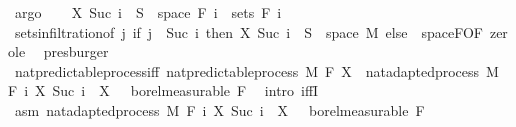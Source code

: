 \begin{isabellebody}
\ argo\isanewline
\ \ \isamarkupfalse%
\ {\isachardoublequoteopen}X\ {\isacharparenleft}{\kern0pt}Suc\ i{\isacharparenright}{\kern0pt}\ {\isacharminus}{\kern0pt}{\isacharbackquote}{\kern0pt}\ S\ {\isasyminter}\ space\ {\isacharparenleft}{\kern0pt}F\ i{\isacharparenright}{\kern0pt}\ {\isasymin}\ sets\ {\isacharparenleft}{\kern0pt}F\ i{\isacharparenright}{\kern0pt}{\isachardoublequoteclose}\ \isamarkupfalse%
\ sets{\isacharunderscore}{\kern0pt}in{\isacharunderscore}{\kern0pt}filtration{\isacharbrackleft}{\kern0pt}of\ {\isachardoublequoteopen}{\isasymlambda}j{\isachardot}{\kern0pt}\ if\ j\ {\isacharequal}{\kern0pt}\ Suc\ i\ then\ {\isacharparenleft}{\kern0pt}X\ {\isacharparenleft}{\kern0pt}Suc\ i{\isacharparenright}{\kern0pt}\ {\isacharminus}{\kern0pt}{\isacharbackquote}{\kern0pt}\ S\ {\isasyminter}\ space\ M{\isacharparenright}{\kern0pt}\ else\ {\isacharbraceleft}{\kern0pt}{\isacharbraceright}{\kern0pt}{\isachardoublequoteclose}{\isacharbrackright}{\kern0pt}\ space{\isacharunderscore}{\kern0pt}F{\isacharbrackleft}{\kern0pt}OF\ zero{\isacharunderscore}{\kern0pt}le{\isacharbrackright}{\kern0pt}\ \isamarkupfalse%
\ presburger\isanewline
{}\isamarkupfalse%
%
\endisatagproof
{\isafoldproof}%
%
\isadelimproof
\isanewline
%
\endisadelimproof
\isanewline
{}\isamarkupfalse%
\ nat{\isacharunderscore}{\kern0pt}predictable{\isacharunderscore}{\kern0pt}process{\isacharunderscore}{\kern0pt}iff{\isacharcolon}{\kern0pt}\ {\isachardoublequoteopen}nat{\isacharunderscore}{\kern0pt}predictable{\isacharunderscore}{\kern0pt}process\ M\ F\ X\ {\isasymlongleftrightarrow}\ nat{\isacharunderscore}{\kern0pt}adapted{\isacharunderscore}{\kern0pt}process\ M\ F\ {\isacharparenleft}{\kern0pt}{\isasymlambda}i{\isachardot}{\kern0pt}\ X\ {\isacharparenleft}{\kern0pt}Suc\ i{\isacharparenright}{\kern0pt}{\isacharparenright}{\kern0pt}\ {\isasymand}\ X\ {}\ {\isasymin}\ borel{\isacharunderscore}{\kern0pt}measurable\ {\isacharparenleft}{\kern0pt}F\ {}{\isacharparenright}{\kern0pt}{\isachardoublequoteclose}\isanewline
%
\isadelimproof
%
\endisadelimproof
%
\isatagproof
{}\isamarkupfalse%
\ {\isacharparenleft}{\kern0pt}intro\ iffI{\isacharparenright}{\kern0pt}\isanewline
\ \ \isamarkupfalse%
\ asm{\isacharcolon}{\kern0pt}\ {\isachardoublequoteopen}nat{\isacharunderscore}{\kern0pt}adapted{\isacharunderscore}{\kern0pt}process\ M\ F\ {\isacharparenleft}{\kern0pt}{\isasymlambda}i{\isachardot}{\kern0pt}\ X\ {\isacharparenleft}{\kern0pt}Suc\ i{\isacharparenright}{\kern0pt}{\isacharparenright}{\kern0pt}\ {\isasymand}\ X\ {}\ {\isasymin}\ borel{\isacharunderscore}{\kern0pt}measurable\ {\isacharparenleft}{\kern0pt}F\ {}{\isacharparenright}{\kern0pt}{\isachardoublequoteclose}\isanewline

\end{isabellebody}
